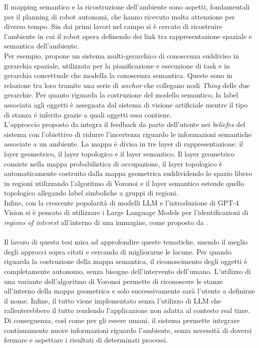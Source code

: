 Il mapping semantico e la ricostruzione dell'ambiente sono aspetti, fondamentali per il planning di robot autonomi, che hanno ricevuto molta attenzione per diverso tempo. Sin dai primi lavori nel campo si è cercato di ricostruire l'ambiente in cui il robot opera definendo dei link tra rappresentazione spaziale e semantica dell'ambiente. \\
Per esempio, \cite{galindo} propone un sistema multi-gerarchico di conoscenza suddiviso in gerarchia spaziale, %
utilizzata per la pianificazione e esecuzione di task e in gerarchia concettuale che modella la conoscenza semantica. Queste sono in relazione tra loro tramite una serie di \textit{anchor} che collegano nodi \textit{Thing} delle due gerarchie. Per quanto riguarda la costruzione del modello semantico, la label associata agli oggetti è assegnata dal sistema di visione artificiale mentre il tipo di stanza é inferito grazie a quali oggetti essa contiene.\\
L'approccio proposto da \cite{theobald_godot} integra il feedback da parte dell'utente nei \textit{beliefes} del sistema con l'obiettivo di ridurre l'incertezza riguardo le informazioni semantiche associate a un ambiente. La mappa è divisa in tre layer di rappresentazione: il layer geometrico, il layer topologico e il layer semantico. Il layer geometrico consiste nella mappa probabilistica di occupazione, il layer topologico è automaticamente costruito dalla mappa geometrica suddividendo lo spazio libero in regioni utilizzando l'algoritmo di Voronoi \cite{thrun} e il layer semantico estende quello topologico allegando label simboliche a gruppi di regioni.\\
Infine, con la crescente popolarità di modelli LLM e l'introduzione di GPT-4 Vision si è pensato di utilizzare i Large Language Models per l'identificazioni di \textit{regions of interest} all'interno di una immagine, come proposto da \cite{RunjiaTan}.\\\\
Il lavoro di questa tesi mira ad approfondire queste tematiche, unendo il meglio degli approcci sopra citati e cercando di migliorarne le lacune. Per quando riguarda la costruzione della mappa semantica, il riconoscimento degli oggetti è completamente autonomo, senza bisogno dell'intervento dell'umano. L'utilizzo di una variante dell'algoritmo di Voronoi permette di riconoscere le stanze all'interno della mappa geometrica e solo successivamente sarà l'utente a definirne il nome. Infine, il tutto viene implementato senza l'utilizzo di LLM che rallenterebbero il tutto rendendo l'applicazione non adatta al contesto real time. Di conseguenza, così come per gli essere umani, il sistema permette integrare continuamente nuove informazioni riguardo l'ambiente, senza necessità di doversi fermare e aspettare i risultati di determinati processi.